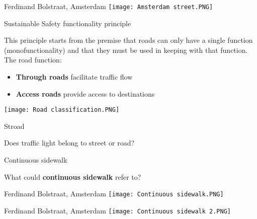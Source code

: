 \documentclass{beamer}
\begin{document}
    \begin{frame}{Ferdinand Bolstraat, Amsterdam}
        \texttt{[image: Amsterdam street.PNG]}
    \end{frame}

    \begin{frame}{Sustainable Safety functionality principle}
        \begin{block}{}
            This principle starts from the premise that roads can only have a single function (monofunctionality) and that they must be used in keeping with that function.
            The road function:\\
            \begin{itemize}
                \item \textbf{Through roads} facilitate traffic flow
                \item \textbf{Access roads} provide access to destinations
            \end{itemize}
        \end{block}
        \texttt{[image: Road classification.PNG]}
    \end{frame}

    \begin{frame}{Stroad}
        \begin{block}{}
            Does traffic light belong to street or road?
        \end{block}
    \end{frame}

    \begin{frame}{Continuous sidewalk}
        \begin{block}{}
            What could \textbf{continuous sidewalk} refer to?
        \end{block}
    \end{frame}

    \begin{frame}{Ferdinand Bolstraat, Amsterdam}
        \texttt{[image: Continuous sidewalk.PNG]}
    \end{frame}

    \begin{frame}{Ferdinand Bolstraat, Amsterdam}
        \texttt{[image: Continuous sidewalk 2.PNG]}
    \end{frame}
\end{document}
